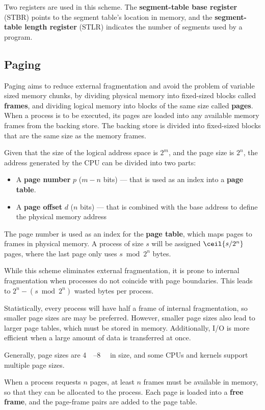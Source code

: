 \documentclass{article}
\begin{document}
Two registers are used in this scheme. The \textbf{segment-table base
register} (STBR) points to the segment table's location in memory, and
the \textbf{segment-table length register} (STLR) indicates the number
of segments used by a program.
\subsection{Paging}
Paging aims to reduce external fragmentation and avoid the problem of
variable sized memory chunks, by dividing physical memory into
fixed-sized blocks called \textbf{frames}, and dividing logical memory
into blocks of the same size called \textbf{pages}. When a process is
to be executed, its pages are loaded into any available memory frames
from the backing store. The backing store is divided into fixed-sized
blocks that are the same size as the memory frames.

Given that the size of the logical address space is \(2^m\), and the
page size is \(2^n\), the address generated by the CPU can be divided
into two parts:
\begin{itemize}
    \item A \textbf{page number} \(p\) (\(m-n\) bits) --- that is used
          as an index into a \textbf{page table}.
    \item A \textbf{page offset} \(d\) (\(n\) bits) --- that is
          combined with the base address to define the physical memory
          address
\end{itemize}
The page number is used as an index for the \textbf{page table}, which
maps pages to frames in physical memory. A process of size \(s\) will
be assigned \(\ceil{s/2^n}\) pages, where the last page only uses
\(s \bmod 2^n\) bytes.

While this scheme eliminates external fragmentation, it is prone to
internal fragmentation when processes do not coincide with page
boundaries. This leads to \(2^n - \left( s \bmod 2^n \right)\) wasted
bytes per process.

Statistically, every process will have half a frame of internal
fragmentation, so smaller page sizes are may be preferred. However,
smaller page sizes also lead to larger page tables, which must be
stored in memory. Additionally, I/O is more efficient when a large
amount of data is transferred at once.

Generally, page sizes are \qtyrange{4}{8}{\kilo\byte} in size, and some
CPUs and kernels support multiple page sizes.

When a process requests \(n\) pages, at least \(n\) frames must be
available in memory, so that they can be allocated to the process. Each
page is loaded into a \textbf{free frame}, and the page-frame pairs are
added to the page table.
\end{document}
